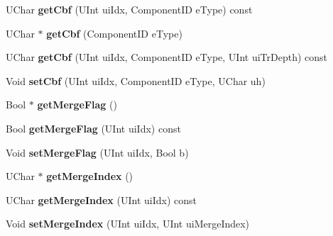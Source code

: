 \begin{DoxyCompactItemize}
\mbox{\label{class_t_com_data_c_u_a40ae118bd03023358f2dfc9d30019660}} 
U\+Char {\bfseries get\+Cbf} (U\+Int ui\+Idx, Component\+ID e\+Type) const
\item 
\mbox{\label{class_t_com_data_c_u_a0690ff6f2112355eeab24983e456f280}} 
U\+Char $\ast$ {\bfseries get\+Cbf} (Component\+ID e\+Type)
\item 
\mbox{\label{class_t_com_data_c_u_a7ceb677667a13082debf02e84517ba63}} 
U\+Char {\bfseries get\+Cbf} (U\+Int ui\+Idx, Component\+ID e\+Type, U\+Int ui\+Tr\+Depth) const
\item 
\mbox{\label{class_t_com_data_c_u_aef6aed57354789b9e4a76f6140ee93a4}} 
Void {\bfseries set\+Cbf} (U\+Int ui\+Idx, Component\+ID e\+Type, U\+Char uh)
\item 
\mbox{\label{class_t_com_data_c_u_a5120692840bf9af39a85a6080dee34d1}} 
Bool $\ast$ {\bfseries get\+Merge\+Flag} ()
\item 
\mbox{\label{class_t_com_data_c_u_ae244ddb5ad9fab1ee1830ed8d30e36f3}} 
Bool {\bfseries get\+Merge\+Flag} (U\+Int ui\+Idx) const
\item 
\mbox{\label{class_t_com_data_c_u_a2e2d361fe6f622c53a7b2195af488404}} 
Void {\bfseries set\+Merge\+Flag} (U\+Int ui\+Idx, Bool b)
\item 
\mbox{\label{class_t_com_data_c_u_a0e59403e3f9475561caf66289c925e32}} 
U\+Char $\ast$ {\bfseries get\+Merge\+Index} ()
\item 
\mbox{\label{class_t_com_data_c_u_a9f18b1f073f748a5aae32c445187e8bb}} 
U\+Char {\bfseries get\+Merge\+Index} (U\+Int ui\+Idx) const
\item 
\mbox{\label{class_t_com_data_c_u_aa364f6028c1721df4aec77aeb47ce3c6}} 
Void {\bfseries set\+Merge\+Index} (U\+Int ui\+Idx, U\+Int ui\+Merge\+Index)
\item 
\mbox{\label{class_t_com_data_c_u_a02bd06f894d5878d7535a7593b4954ed}} 

\end{DoxyCompactItemize}
